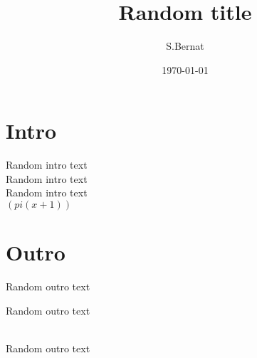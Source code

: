 \documentclass [12pt] {article}
\begin{document}
\title {Random title}
\author {S.Bernat}
\date{\today}
\maketitle

\section {Intro}
Random intro text\\
Random intro text \\
Random intro text\\
$(pi(x+1))$ \\

\section {Outro}
Random outro text\\
\begin {huge}Random outro text\end{huge}\\
Random outro text\\
\end{document}
